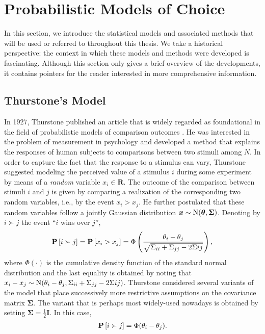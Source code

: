 \section{Probabilistic Models of Choice}
\label{in:sec:models}

In this section, we introduce the statistical models and associated methods that will be used or referred to throughout this thesis.
We take a historical perspective: the context in which these models and methods were developed is fascinating.
Although this section only gives a brief overview of the developments, it contains pointers for the reader interested in more comprehensive information.

\subsection{Thurstone's Model}
In 1927, Thurstone published an article that is widely regarded as foundational in the field of probabilistic models of comparison outcomes \citep{thurstone1927law}.
He was interested in the problem of measurement in psychology and developed a method that explains the responses of human subjects to comparisons between two stimuli among $N$.
In order to capture the fact that the response to a stimulus can vary, Thurstone suggested modeling the perceived value of a stimulus $i$ during some experiment by means of a \emph{random} variable $x_i \in \mathbf{R}$.
The outcome of the comparison between stimuli $i$ and $j$ is given by comparing a realization of the corresponding two random variables, i.e., by the event $x_i > x_j$.
He further postulated that these random variables follow a jointly Gaussian distribution $\bm{x} \sim \mathrm{N}( \bm{\theta}, \bm{\Sigma} )$.
Denoting by $i \succ j$ the event ``$i$ wins over $j$'',
\begin{align*}
\mathbf{P}\left[ i \succ j \right] = \mathbf{P}\left[ x_i > x_j \right] = \Phi \left( \frac{\theta_i - \theta_j}{\sqrt{\Sigma_{ii} + \Sigma_{jj} - 2\Sigma{ij}}} \right),
\end{align*}
where $\Phi(\cdot)$ is the cumulative density function of the standard normal distribution and the last equality is obtained by noting that $x_i - x_j \sim \mathrm{N}( \theta_i - \theta_j, \Sigma_{ii} + \Sigma_{jj} - 2\Sigma{ij} )$.
Thurstone considered several variants of the model that place successively more restrictive assumptions on the covariance matrix $\bm{\Sigma}$.
The variant that is perhaps most widely-used nowadays is obtained by setting $\bm{\Sigma} = \tfrac{1}{2} \bm{I}$.
In this case,
\begin{align}
\label{in:eq:thu5}
\mathbf{P}\left[ i \succ j \right] = \Phi(\theta_i - \theta_j).
\end{align}
